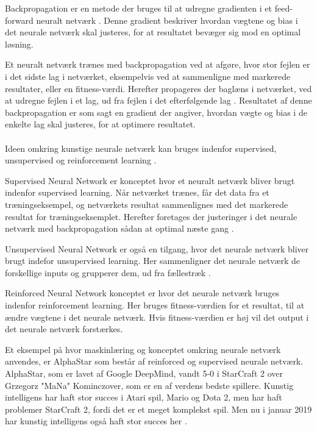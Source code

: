Backpropagation er en metode der bruges til at udregne gradienten i et feed-forward neuralt netværk \cite{Nielsen2015}. Denne gradient beskriver hvordan vægtene og bias i det neurale netværk skal justeres, for at resultatet bevæger sig mod en optimal løsning. 
\par %
Et neuralt netværk trænes med backpropagation ved at afgøre, hvor stor fejlen er i det sidste lag i netværket, eksempelvis ved at sammenligne med markerede resultater, eller en fitness-værdi. Herefter propageres der baglæns i netværket, ved at udregne fejlen i et lag, ud fra fejlen i det efterfølgende lag \cite{Nielsen2015}. Resultatet af denne backpropagation er som sagt en gradient der angiver, hvordan vægte og bias i de enkelte lag skal justeres, for at optimere resultatet. 
\\\\

Ideen omkring kunstige neurale netværk kan bruges indenfor supervised, unsupervised og reinforcement learning \cite{dey2016machine}. 
\par
Supervised Neural Network er konceptet hvor et neuralt netværk bliver brugt indenfor supervised learning. Når netværket trænes, får det data fra et træningseksempel, og netværkets resultat sammenlignes med det markerede resultat for træningseksemplet. Herefter foretages der justeringer i det neurale netværk med backpropagation sådan at optimal næste gang \cite{dey2016machine}.
\par
Unsupervised Neural Network er også en tilgang, hvor det neurale netværk bliver brugt indefor unsupervised learning. Her sammenligner det neurale netværk de forskellige inputs og grupperer dem, ud fra fællestræk \cite{dey2016machine}.
\par
Reinforced Neural Network konceptet er hvor det neurale netværk bruges indenfor reinforcement learning. Her bruges fitness-værdien for et resultat, til at ændre vægtene i det neurale netværk. Hvis fitness-værdien er høj vil det output i det neurale netværk forstærkes\cite{dey2016machine}. 
\par
Et eksempel på hvor maskinlæring og konceptet omkring neurale netværk anvendes, er AlphaStar som består af reinforced og supervised neurale netværk. AlphaStar, som er lavet af Google DeepMind, vandt 5-0 i StarCraft 2 over Grzegorz "MaNa" Kominczover, som er en af verdens bedste spillere. Kunstig intelligens har haft stor succes i Atari spil, Mario og Dota 2, men har haft problemer StarCraft 2, fordi det er et meget komplekst spil. Men nu i januar 2019 har kunstig intelligens også haft stor succes her \cite{AlphaStar}.

